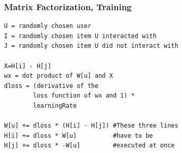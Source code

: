 \documentclass[mathserif]{beamer}
\newcommand\marktopleft[1]{%
    \tikz[overlay,remember picture] 
    \node (marker-#1-a) at (0,1.5ex) {};%
}
\newcommand\markbottomright[2][red]{%
    \tikz[overlay,remember picture] 
    \node (marker-#2-b) at (0,0) {};%
    \tikz[overlay,remember picture,thick,inner sep=3pt,fill=red]
    \node[draw,rectangle,fill=#1,nearly transparent,fit=(marker-#2-a.center) (marker-#2-b.center)] {};%
}
\begin{document}
\begin{frame}[fragile]
    \frametitle{Matrix Factorization, Training}
\begin{lstlisting}[style=pseudocode]
U = randomly chosen user
I = randomly chosen item U interacted with
J = randomly chosen item U did not interact with

X=H[i] - H[j]
wx = dot product of W[u] and X
dloss = (derivative of the 
        loss function of wx and 1) * 
        learningRate
        
W[u] += dloss * (H[i] - H[j]) #These three lines
H[i] += dloss * W[u]          #have to be
H[j] += dloss * -W[u]         #executed at once
\end{lstlisting}
\end{frame}
%
\end{document}
